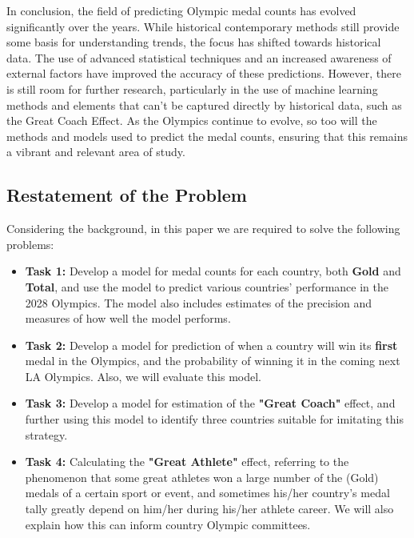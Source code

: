 In conclusion, the field of predicting Olympic medal counts has evolved significantly over the years. While historical contemporary methods still provide some basis for understanding trends, the focus has shifted towards historical data. The use of advanced statistical techniques and an increased awareness of external factors have improved the accuracy of these predictions. 
However, there is still room for further research, particularly in the use of machine learning methods and elements that can't be captured directly by historical data, such as the Great Coach Effect. As the Olympics continue to evolve, so too will the methods and models used to predict the medal counts, ensuring that this remains a vibrant and relevant area of study.

\subsection{Restatement of the Problem}
Considering the background, in this paper we are required to solve the following problems:

\begin{itemize}
\item{\bf Task 1:} Develop a model for medal counts for each country, both \textbf{Gold} and \textbf{Total}, and use the model to predict various countries' performance in the 2028 Olympics. The model also includes estimates of the precision and measures of how well the model performs.

\item{\bf Task 2:} Develop a model for prediction of when a country will win its \textbf{first} medal in the Olympics, and the probability of winning it in the coming next LA Olympics. Also, we will evaluate this model.

\item{\bf Task 3:} Develop a model for estimation of the \textbf{"Great Coach"} effect, and further using this model to identify three countries suitable for imitating this strategy.

\item{\bf Task 4:} Calculating the \textbf{"Great Athlete"} effect, referring to the phenomenon that some great athletes won a large number of the (Gold) medals of a certain sport or event, and sometimes his/her country's medal tally greatly depend on him/her during his/her athlete career. We will also explain how this can inform country Olympic committees.
\end{itemize}

